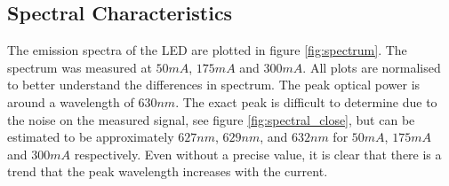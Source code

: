 \subsection{Spectral Characteristics}
\label{sec:test:spectral}

%



The emission spectra of the LED are plotted in figure \ref{fig:spectrum}. The spectrum was measured at $50mA$, $175mA$ and $300mA$. All plots are normalised to better understand the differences in spectrum. The peak optical power is around a wavelength of $630nm$. The exact peak is difficult to determine due to the noise on the measured signal, see figure \ref{fig:spectral_close}, but can be estimated to be approximately $627nm$, $629nm$, and $632nm$ for $50mA$, $175mA$ and $300mA$ respectively. Even without a precise value, it is clear that there is a trend that the peak wavelength increases with the current.
